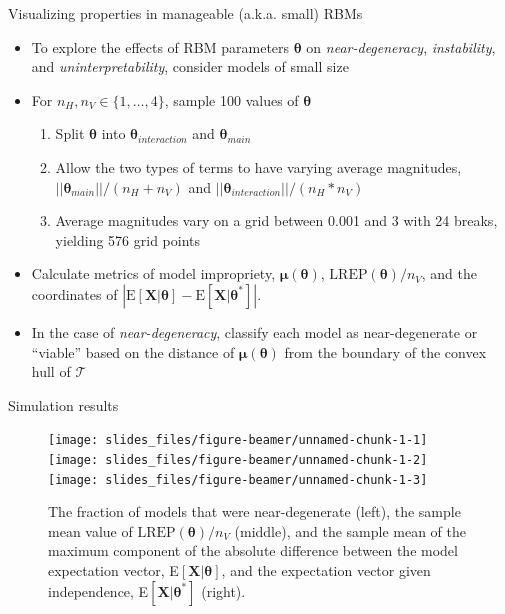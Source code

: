 \documentclass[ignorenonframetext,]{beamer}
\providecommand{\tightlist}{%
  \setlength{\itemsep}{0pt}\setlength{\parskip}{0pt}}
\theoremstyle{definition}
\newcommand{\nv}{{n_{\scriptscriptstyle V}}}
\newcommand{\nh}{{n_{\scriptscriptstyle H}}}
\begin{document}
\begin{frame}{Visualizing properties in manageable (a.k.a. small) RBMs}
\protect\hypertarget{visualizing-properties-in-manageable-a.k.a.-small-rbms}{}

\begin{itemize}
\tightlist
\item
  To explore the effects of RBM parameters \(\boldsymbol \theta\) on
  \emph{near-degeneracy}, \emph{instability}, and
  \emph{uninterpretability}, consider models of small size\\
\item
  For \(\nh, \nv \in \{1, \dots, 4\}\), sample 100 values of
  \(\boldsymbol \theta\)

  \begin{enumerate}
  \tightlist
  \item
    Split \(\boldsymbol \theta\) into
    \(\boldsymbol \theta_{interaction}\) and
    \(\boldsymbol \theta_{main}\)
  \item
    Allow the two types of terms to have varying average magnitudes,
    \(||\boldsymbol \theta_{main} || /(\nh+\nv)\) and
    \(||\boldsymbol \theta_{interaction} || /(\nh*\nv)\)
  \item
    Average magnitudes vary on a grid between 0.001 and 3 with 24
    breaks, yielding 576 grid points
  \end{enumerate}
\item
  Calculate metrics of model impropriety,
  \(\boldsymbol \mu(\boldsymbol \theta)\),
  \(\text{LREP}(\boldsymbol \theta)/\nv\), and the coordinates of
  \(\left|\text{E}\left[\boldsymbol X | \boldsymbol \theta\right] - \text{E}\left[\boldsymbol X | \boldsymbol \theta^* \right] \right|\).
\item
  In the case of \emph{near-degeneracy}, classify each model as
  near-degenerate or ``viable'' based on the distance of
  \(\boldsymbol \mu(\boldsymbol \theta)\) from the boundary of the
  convex hull of \(\mathcal{T}\)
\end{itemize}

\end{frame}

\begin{frame}{Simulation results}
\protect\hypertarget{simulation-results}{}

\begin{figure}
\texttt{[image: slides\_files/figure-beamer/unnamed-chunk-1-1]} \texttt{[image: slides\_files/figure-beamer/unnamed-chunk-1-2]} \texttt{[image: slides\_files/figure-beamer/unnamed-chunk-1-3]} \caption{\label{fig:degen_plots}The fraction of models that were near-degenerate (left), the sample mean value of $\text{LREP}(\boldsymbol \theta)/\nv$ (middle), and the sample mean of the maximum component of the absolute difference between the model expectation vector, E$\left[\boldsymbol X | \boldsymbol \theta\right]$, and the expectation vector given independence, E$\left[\boldsymbol X | \boldsymbol \theta^* \right ]$ (right).}\label{fig:unnamed-chunk-1}
\end{figure}

\end{frame}
\end{document}

